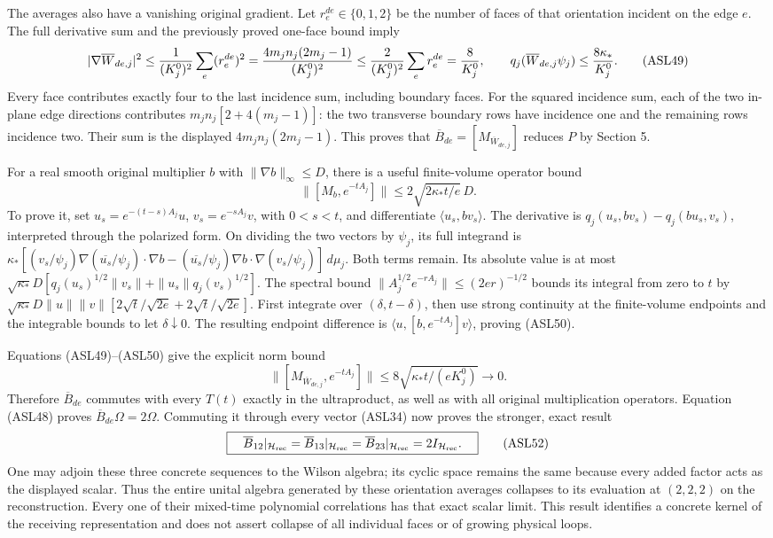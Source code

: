 \documentclass[11pt]{article}
\begin{document}
The averages also have a vanishing original gradient. Let \(r_e^{de}\in\{0,1,2\}\) be the number of faces of that orientation incident on the edge \(e\). The full derivative sum and the previously proved one-face bound imply
\[
 |\nabla\overline W_{de,j}|^2
 \le{1\over(K_j^0)^2}\sum_e(r_e^{de})^2
 ={4m_jn_j(2m_j-1)\over(K_j^0)^2}
 \le{2\over(K_j^0)^2}\sum_er_e^{de}
 ={8\over K_j^0},\qquad
 q_j(\overline W_{de,j}\psi_j)\le{8\kappa_*\over K_j^0}.
 \tag{ASL49}
\]
Every face contributes exactly four to the last incidence sum, including boundary faces. For the squared incidence sum, each of the two in-plane edge directions contributes \(m_jn_j[2+4(m_j-1)]\): the two transverse boundary rows have incidence one and the remaining rows incidence two. Their sum is the displayed \(4m_jn_j(2m_j-1)\). This proves that \(\overline B_{de}=[M_{\overline W_{de,j}}]\) reduces \(P\) by Section 5.

For a real smooth original multiplier \(b\) with \(\|\nabla b\|_\infty\le D\), there is a useful finite-volume operator bound
\[
 \|[M_b,e^{-tA_j}]\|\le2\sqrt{2\kappa_*t/e}\,D.
 \tag{ASL50}
\]
To prove it, set \(u_s=e^{-(t-s)A_j}u\), \(v_s=e^{-sA_j}v\), with \(0<s<t\), and differentiate \(\langle u_s,bv_s\rangle\). The derivative is \(q_j(u_s,bv_s)-q_j(bu_s,v_s)\), interpreted through the polarized form. On dividing the two vectors by \(\psi_j\), its full integrand is
\(\kappa_*[(v_s/\psi_j)\nabla(\overline{u_s}/\psi_j)\cdot\nabla b-(\overline{u_s}/\psi_j)\nabla b\cdot\nabla(v_s/\psi_j)]\,d\mu_j\).
Both terms remain. Its absolute value is at most
\(\sqrt{\kappa_*}D[q_j(u_s)^{1/2}\|v_s\|+\|u_s\|q_j(v_s)^{1/2}]\).
The spectral bound \(\|A_j^{1/2}e^{-rA_j}\|\le(2er)^{-1/2}\) bounds its integral from zero to \(t\) by
\(\sqrt{\kappa_*}D\|u\|\|v\|[2\sqrt t/\sqrt{2e}+2\sqrt t/\sqrt{2e}]\).
First integrate over \((\delta,t-\delta)\), then use strong continuity at the finite-volume endpoints and the integrable bounds to let \(\delta\downarrow0\). The resulting endpoint difference is \(\langle u,[b,e^{-tA_j}]v\rangle\), proving (ASL50).

Equations (ASL49)–(ASL50) give the explicit norm bound
\[
 \|[M_{\overline W_{de,j}},e^{-tA_j}]\|
 \le8\sqrt{\kappa_*t/(eK_j^0)}\longrightarrow0.
 \tag{ASL51}
\]
Therefore \(\overline B_{de}\) commutes with every \(T(t)\) exactly in the ultraproduct, as well as with all original multiplication operators. Equation (ASL48) proves \(\overline B_{de}\Omega=2\Omega\). Commuting it through every vector (ASL34) now proves the stronger, exact result
\[
 \boxed{\quad \overline B_{12}|_{\mathcal H_{\rm rec}}
 =\overline B_{13}|_{\mathcal H_{\rm rec}}
 =\overline B_{23}|_{\mathcal H_{\rm rec}}=2I_{\mathcal H_{\rm rec}}.\quad}
 \tag{ASL52}
\]
One may adjoin these three concrete sequences to the Wilson algebra; its cyclic space remains the same because every added factor acts as the displayed scalar. Thus the entire unital algebra generated by these orientation averages collapses to its evaluation at \((2,2,2)\) on the reconstruction. Every one of their mixed-time polynomial correlations has that exact scalar limit. This result identifies a concrete kernel of the receiving representation and does not assert collapse of all individual faces or of growing physical loops.
\end{document}
